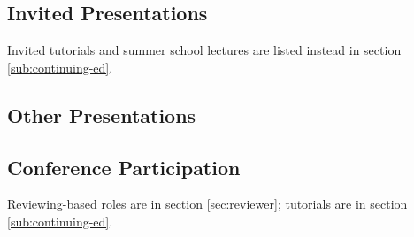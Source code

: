 \documentclass[10pt]{article}
\begin{document}
%

\subsection{Invited Presentations} %

Invited tutorials and summer school lectures are listed instead in section \ref{sub:continuing-ed}.
{\color{white} \competitive\international\national\local\virtual\paid}

\begin{itemize}[leftmargin=5em]

\end{itemize}


\subsection{Other Presentations}

\begin{itemize}[leftmargin=5em]

\end{itemize}


%

\subsection{Conference Participation} %
\label{sec:conference-participation}

Reviewing-based roles are in section \ref{sec:reviewer}; tutorials are in section \ref{sub:continuing-ed}.
\end{document}
